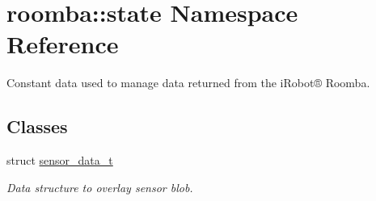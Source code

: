 \hypertarget{namespaceroomba_1_1state}{\section{roomba\+:\+:state Namespace Reference}
\label{namespaceroomba_1_1state}
}


Constant data used to manage data returned from the i\+Robot® Roomba.  


\subsection*{Classes}
\begin{DoxyCompactItemize}
\item 
struct \hyperlink{structroomba_1_1state_1_1sensor__data__t}{sensor\+\_\+data\+\_\+t}
\begin{DoxyCompactList}\small\item\em Data structure to overlay sensor blob. \end{DoxyCompactList}\end{DoxyCompactItemize}
